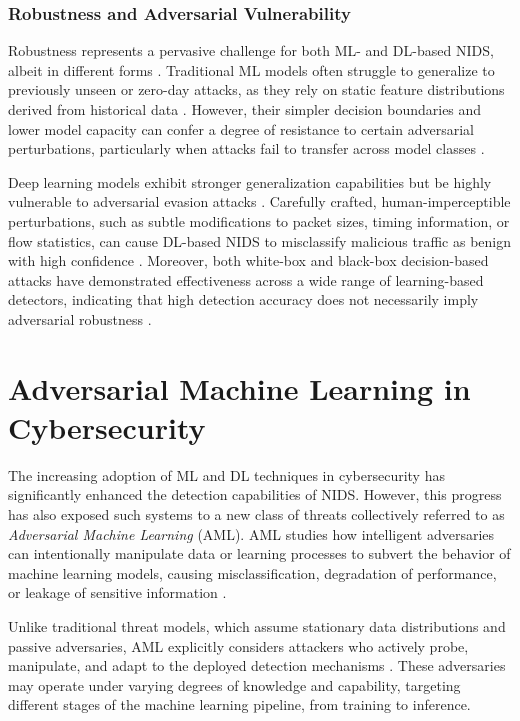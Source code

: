 \subsubsection{Robustness and Adversarial Vulnerability}

Robustness represents a pervasive challenge for both ML- and DL-based NIDS, albeit in different forms \cite{he2023adversarial}. 
Traditional ML models often struggle to generalize to previously unseen or zero-day attacks, as they rely on static feature distributions derived from historical data \cite{yang2025self}. 
However, their simpler decision boundaries and lower model capacity can confer a degree of resistance to certain adversarial perturbations, particularly when attacks fail to transfer across model classes \cite{yuan2024simple}.

Deep learning models exhibit stronger generalization capabilities but be highly vulnerable to adversarial evasion attacks \cite{zhang2022adversarial}. 
Carefully crafted, human-imperceptible perturbations, such as subtle modifications to packet sizes, timing information, or flow statistics, can cause DL-based NIDS to misclassify malicious traffic as benign with high confidence \cite{sauka2022adversarial}. 
Moreover, both white-box and black-box decision-based attacks have demonstrated effectiveness across a wide range of learning-based detectors, indicating that high detection accuracy does not necessarily imply adversarial robustness \cite{sharma2024systematic}.

\section{Adversarial Machine Learning in Cybersecurity}

The increasing adoption of ML and DL techniques in cybersecurity has significantly enhanced the detection capabilities of NIDS. However, this progress has also exposed such systems to a new class of threats collectively referred to as \emph{Adversarial Machine Learning} (AML). AML studies how intelligent adversaries can intentionally manipulate data or learning processes to subvert the behavior of machine learning models, causing misclassification, degradation of performance, or leakage of sensitive information \cite{huang2011adversarial}. 

Unlike traditional threat models, which assume stationary data distributions and passive adversaries, AML explicitly considers attackers who actively probe, manipulate, and adapt to the deployed detection mechanisms \cite{khorshidpour2018domain}. These adversaries may operate under varying degrees of knowledge and capability, targeting different stages of the machine learning pipeline, from training to inference.

